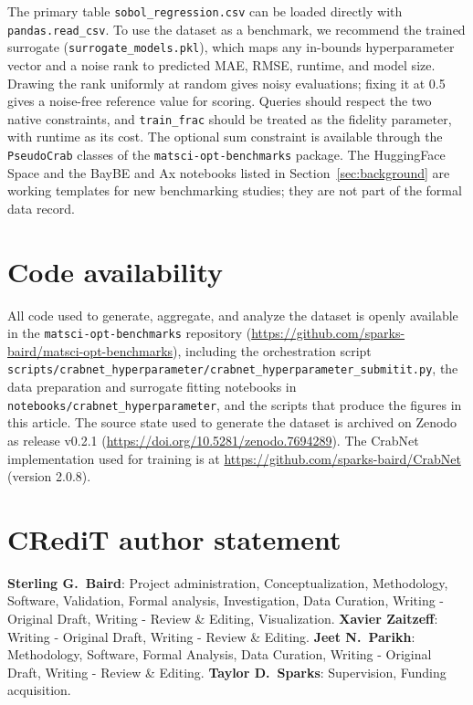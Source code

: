 \documentclass[pdflatex,sn-mathphys-num]{sn-jnl}
\begin{document}
The primary table \texttt{sobol\_regression.csv} can be loaded directly with \texttt{pandas.read\_csv}. To use the dataset as a benchmark, we recommend the trained surrogate (\texttt{surrogate\_models.pkl}), which maps any in-bounds hyperparameter vector and a noise rank to predicted MAE, RMSE, runtime, and model size. Drawing the rank uniformly at random gives noisy evaluations; fixing it at 0.5 gives a noise-free reference value for scoring. Queries should respect the two native constraints, and \texttt{train\_frac} should be treated as the fidelity parameter, with runtime as its cost. The optional sum constraint is available through the \texttt{PseudoCrab} classes of the \texttt{matsci-opt-benchmarks} package. The HuggingFace Space and the BayBE and Ax notebooks listed in Section~\ref{sec:background} are working templates for new benchmarking studies; they are not part of the formal data record.

\section{Code availability}\label{sec:code}

All code used to generate, aggregate, and analyze the dataset is openly available in the \texttt{matsci-opt-benchmarks} repository (\url{https://github.com/sparks-baird/matsci-opt-benchmarks}), including the orchestration script \texttt{scripts/crabnet\_hyperparameter/crabnet\_hyperparameter\_submitit.py}, the data preparation and surrogate fitting notebooks in \texttt{notebooks/crabnet\_hyperparameter}, and the scripts that produce the figures in this article. The source state used to generate the dataset is archived on Zenodo as release v0.2.1 (\url{https://doi.org/10.5281/zenodo.7694289}). The CrabNet implementation used for training is at \url{https://github.com/sparks-baird/CrabNet} (version 2.0.8).

\section*{CRediT author statement}

\textbf{Sterling G.~Baird}: Project administration, Conceptualization, Methodology, Software, Validation, Formal analysis, Investigation, Data Curation, Writing - Original Draft, Writing - Review \& Editing, Visualization. \textbf{Xavier Zaitzeff}: Writing - Original Draft, Writing - Review \& Editing. \textbf{Jeet N.~Parikh}: Methodology, Software, Formal Analysis, Data Curation, Writing - Original Draft, Writing - Review \& Editing. \textbf{Taylor D.~Sparks}: Supervision, Funding acquisition.
\end{document}

